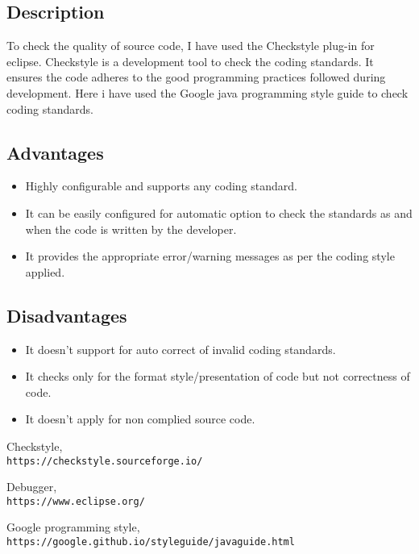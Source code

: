 \documentclass[12pt]{report}
\begin{document}
\subsection{Description}
To check the quality of source code, I have used the Checkstyle plug-in for eclipse. Checkstyle is a development tool to check the coding standards. It ensures the code adheres to the good programming practices followed during development. Here i have used the Google java programming style guide to check coding standards.

\subsection{Advantages}
\begin{itemize}
    \item Highly configurable and supports any coding standard.
    \item It can be easily configured for automatic option to check the standards as and when the code is written by the developer.
    \item It provides the appropriate error/warning messages as per the coding style applied.
\end{itemize}

\subsection{Disadvantages}
\begin{itemize}
    \item It doesn’t support for auto correct of invalid coding standards.
    \item It checks only for the format style/presentation of code  but not correctness of code.
    \item It doesn’t apply for non complied source code.
\end{itemize}

\begin{thebibliography}{9}
Checkstyle,
\\\texttt{https://checkstyle.sourceforge.io/}

Debugger,
\\\texttt{https://www.eclipse.org/}

Google programming style,
\\\texttt{https://google.github.io/styleguide/javaguide.html}

\end{thebibliography}
\end{document}
